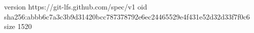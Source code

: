 version https://git-lfs.github.com/spec/v1
oid sha256:abbb6c7a3c3b9d31420bcc787378792e6ec24465529e4f431e52d32d33f7f0c6
size 1520
